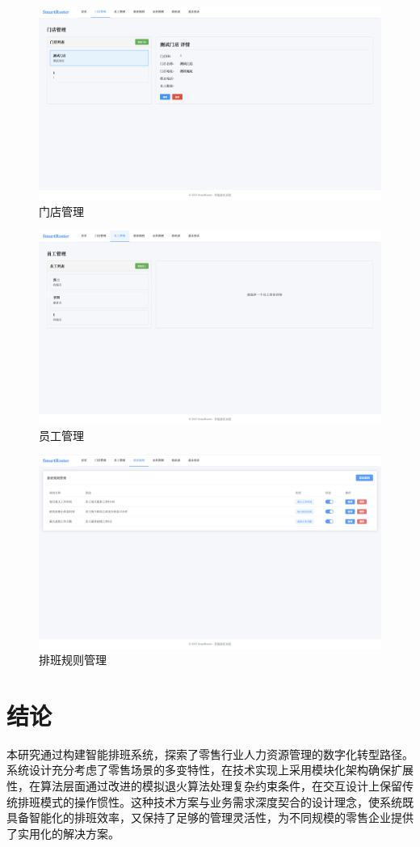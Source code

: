 \documentclass{ctexart}
\begin{document}
\begin{figure}[H]
    \centering
    \includegraphics[width=0.8\linewidth]{./source/门店管理.png}
    \caption{门店管理}
\end{figure}
\begin{figure}[H]
    \centering
    \includegraphics[width=0.8\linewidth]{./source/员工管理.png}
    \caption{员工管理}
\end{figure}
\begin{figure}[H]
    \centering
    \includegraphics[width=0.8\linewidth]{./source/排班规则管理.png}
    \caption{排班规则管理}
\end{figure}


\section{结论}
本研究通过构建智能排班系统，探索了零售行业人力资源管理的数字化转型路径。系统设计充分考虑了零售场景的多变特性，在技术实现上采用模块化架构确保扩展性，在算法层面通过改进的模拟退火算法处理复杂约束条件，在交互设计上保留传统排班模式的操作惯性。这种技术方案与业务需求深度契合的设计理念，使系统既具备智能化的排班效率，又保持了足够的管理灵活性，为不同规模的零售企业提供了实用化的解决方案。
\end{document}
